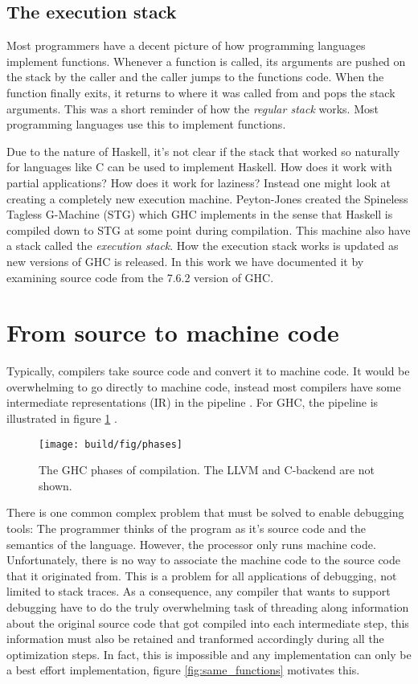 \subsection{The execution stack}

Most programmers have a decent picture of how programming languages
implement functions. Whenever a function is called, its arguments are
pushed on the stack by the caller and the caller jumps to the functions
code. When the function finally exits, it returns to where it was called
from and pops the stack arguments. This was a short reminder of how
the \emph{regular stack} works. Most programming languages use this to
implement functions.

Due to the nature of Haskell, it's not clear if the stack that worked
so naturally for languages like C can be used to implement Haskell.
How does it work with partial applications? How does it work for
laziness? Instead one might look at creating a completely new execution
machine. Peyton-Jones created the Spineless Tagless G-Machine (STG)
\cite{stg_1992} which GHC implements \cite{evalapplyjfp06} in the sense
that Haskell is compiled down to STG at some point during compilation.
This machine also have a stack called the \emph{execution stack}. How
the execution stack works is updated as new versions of GHC is released.
In this work we have documented it by examining source code
from the 7.6.2 version of GHC.

\section{From source to machine code}

Typically, compilers take source code and convert it to machine code.
It would be overwhelming to go directly to machine code, instead most
compilers have some intermediate representations (IR) in the pipeline \cite[p.358]{aho2007compilers}.  For GHC, the pipeline is illustrated in
figure \ref{fig:ghc_phases} \cite{terei2009low}.

\begin{figure}
  \centering
  \texttt{[image: build/fig/phases]}
  \caption{The GHC phases of compilation. The LLVM and C-backend are not
shown.}\label{fig:ghc_phases}
\end{figure}

There is one common complex problem that must be solved to enable debugging
tools: The programmer thinks of the program as it's source code and the
semantics of the language. However, the processor only runs machine code.
Unfortunately, there is no way to associate the machine code to the
source code that it originated from. This is a problem for all applications of
debugging, not limited to stack traces. \cite{eager2012introduction} As a consequence, any
compiler that wants to support debugging have to do the truly overwhelming task of threading along
information about the original source code that got compiled into each
intermediate step, this information must also be retained and tranformed
accordingly during all the optimization steps. In fact, this is impossible and
any implementation can only be a best effort implementation, figure
\ref{fig:same_functions} motivates this.

